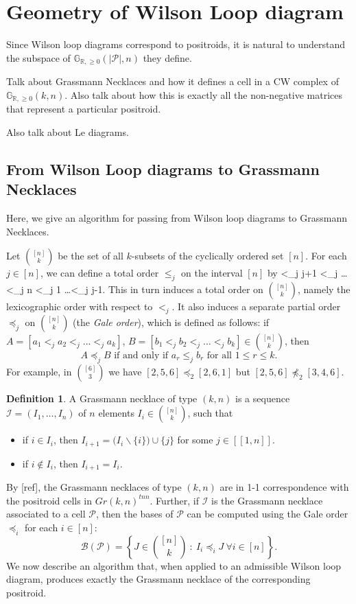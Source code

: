 \documentclass[11pt]{article}
\newcommand{\R}{\mathbb{R}}
\newcommand{\Gr}{\mathbb{G}_{\R, \geq 0}}
\def\bas #1\eas{\begin{align*} #1 \end{align*}}
\newcommand{\cP}{\mathcal{P}}
\newcommand{\II}{\mathcal{I}}
\newcommand{\PP}{\mathcal{P}}
\newcommand{\BB}{\mathcal{B}}
\newcommand{\interval}[2]{[\![#1,#2]\!]}
\newcommand{\gale}[1]{\preccurlyeq_{#1}}
\theoremstyle{remark}
\theoremstyle{definition}
\newtheorem{dfn}[thm]{Definition}
\begin{document}
\section{Geometry of Wilson Loop diagram}
Since Wilson loop diagrams correspond to positroids, it is natural to understand the subspace of $\Gr(|\cP|, n)$ they define.

Talk about Grassmann Necklaces and how it defines a cell in a CW complex of $\Gr(k,n)$. Also talk about how this is exactly all the non-negative matrices that represent a particular positroid.

Also talk about Le diagrams.

\subsection{From Wilson Loop diagrams to Grassmann Necklaces}

Here, we give an algorithm for passing from Wilson loop diagrams to Grassmann Necklaces.

Let $\binom{[n]}{k}$ be the set of all $k$-subsets of the cyclically ordered set $[n]$.  For each $j \in [n]$, we can define a total order $\leq_j$ on the interval $[n]$ by
\bas j <_j j+1 <_j \dots <_j n <_j 1 \dots <_j j-1\;.\eas
This in turn induces a total order on $\binom{[n]}{k}$, namely the lexicographic order with respect to $<_j$.  It also induces a separate partial order $\gale{j}$ on $\binom{[n]}{k}$ (the \textit{Gale order}), which is defined as follows: if $A = [a_1 <_j a_2 <_j \dots <_j a_k]$,  $B = [b_1 <_j b_2 <_j \dots <_j b_k] \in \binom{[n]}{k}$, then
\[A \gale{j} B \text{ if and only if } a_r \leq_j b_r \text{ for all }1 \leq r \leq k.\]
For example, in $\binom{[6]}{3}$ we have $[2,5,6]\gale{2} [2,6,1]$ but $[2,5,6]\not\gale{2}[3,4,6]$.


\begin{dfn}\label{def:grassmann necklace}
A Grassmann necklace of type $(k,n)$ is a sequence $\II = (I_1, \dots, I_n)$ of $n$ elements $I_i \in \binom{[n]}{k}$, such that
\begin{itemize}
\item if $i \in I_i$, then $I_{i+1} = \big(I_i \backslash \{i\}\big) \cup \{j\}$ for some $j \in \interval{1}{n}$.
\item if $i \not\in I_i$, then $I_{i+1} = I_i$.
\end{itemize}
\end{dfn}

By [ref], the Grassmann necklaces of type $(k,n)$ are in 1-1 correspondence with the positroid cells in $Gr(k,n)^{tnn}$.  Further, if $\II$ is the Grassmann necklace associated to a cell $\PP$, then the bases of $\PP$ can be computed using the Gale order $\gale{i}$ for each $i \in [n]$:
\[\BB(\PP) = \left\{J \in \binom{[n]}{k}\ :\ I_i \gale{i} J \ \forall i \in [n]\right\}.\]
We now describe an algorithm that, when applied to an admissible Wilson loop diagram, produces exactly the Grassmann necklace of the corresponding positroid.
\end{document}
